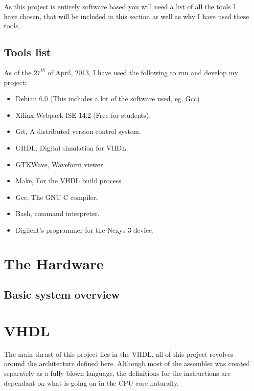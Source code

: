 \documentclass	[a4paper, 10pt]	{article}
\begin{document}
  As this project is entirely software based you will need a list of all the tools
  I have chosen, that will be included in this section as well as why I have used
  these tools.

    \subsection{Tools list}

    As of the $27^{th}$ of April, 2013, I have used the following to run and develop
    my project:

    \begin{itemize}
      \item Debian 6.0 (This includes a lot of the software used, eg. Gcc)
      \item Xilinx Webpack ISE 14.2 (Free for students).
      \item Git, A distributed version control system.
      \item GHDL, Digital simulation for VHDL.
      \item GTKWave, Waveform viewer.
      \item Make, For the VHDL build process.
      \item Gcc, The GNU C compiler.
      \item Bash, command interpreter.
      \item Digilent's programmer for the Nexys 3 device.
    \end{itemize}


  \section{The Hardware}

  \subsection{Basic system overview}

  \section{VHDL}

  The main thrust of this project lies in the VHDL, all of this project revolves around
  the architecture defined here. Although most of the assembler was created separately
  as a fully blown language, the definitions for the instructions are dependant on what 
  is going on in the CPU core naturally.
\end{document}
